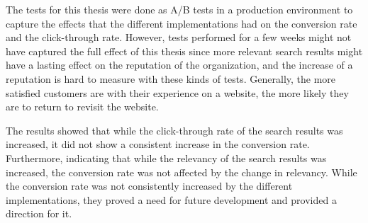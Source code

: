 The tests for this thesis were done as A/B tests in a production environment to capture the 
effects that the different implementations had on the conversion rate and the click-through rate.
However, tests performed for a few weeks might not have captured the full effect of this thesis 
since more relevant search results might have a lasting effect on the reputation of the organization, 
and the increase of a reputation is hard to measure with these kinds of tests. 
Generally, the more satisfied customers are with their experience on a website, 
the more likely they are to return to revisit the website.


The results showed that while the click-through rate of the search results was increased, it did not
show a consistent increase in the conversion rate. 
Furthermore, indicating that while the relevancy of the search results was increased, the conversion
rate was not affected by the change in relevancy.
While the conversion rate was not consistently increased by the different implementations, they
proved a need for future development and provided a direction for it.



